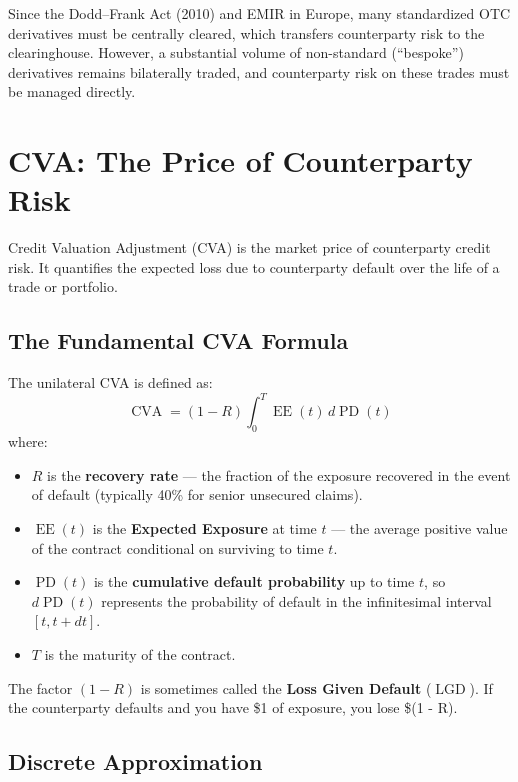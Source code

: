 \documentclass[11pt, a4paper]{article}
\theoremstyle{definition}
\theoremstyle{plain}
\theoremstyle{remark}
\newcommand{\CVA}{\operatorname{CVA}}
\newcommand{\EE}{\operatorname{EE}}
\newcommand{\LGD}{\operatorname{LGD}}
\newcommand{\PD}{\operatorname{PD}}
\begin{document}
Since the Dodd--Frank Act (2010) and EMIR in Europe, many standardized OTC derivatives
must be centrally cleared, which transfers counterparty risk to the clearinghouse.
However, a substantial volume of non-standard (``bespoke'') derivatives remains
bilaterally traded, and counterparty risk on these trades must be managed directly.

\section{CVA: The Price of Counterparty Risk}
\label{sec:cva-formula}

Credit Valuation Adjustment (CVA) is the market price of counterparty credit risk.
It quantifies the expected loss due to counterparty default over the life of a trade
or portfolio.

\subsection{The Fundamental CVA Formula}

The unilateral CVA is defined as:
\begin{equation}\label{eq:cva-integral}
    \CVA = (1 - R)\int_0^T \EE(t)\, d\PD(t)
\end{equation}
where:
\begin{itemize}
    \item $R$ is the \textbf{recovery rate} --- the fraction of the exposure recovered
          in the event of default (typically 40\% for senior unsecured claims).
    \item $\EE(t)$ is the \textbf{Expected Exposure} at time $t$ --- the average
          positive value of the contract conditional on surviving to time $t$.
    \item $\PD(t)$ is the \textbf{cumulative default probability} up to time $t$,
          so $d\PD(t)$ represents the probability of default in the infinitesimal interval $[t, t+dt]$.
    \item $T$ is the maturity of the contract.
\end{itemize}

The factor $(1 - R)$ is sometimes called the \textbf{Loss Given Default} ($\LGD$).
If the counterparty defaults and you have \$1 of exposure, you lose \$(1 - R).

\subsection{Discrete Approximation}
\end{document}
